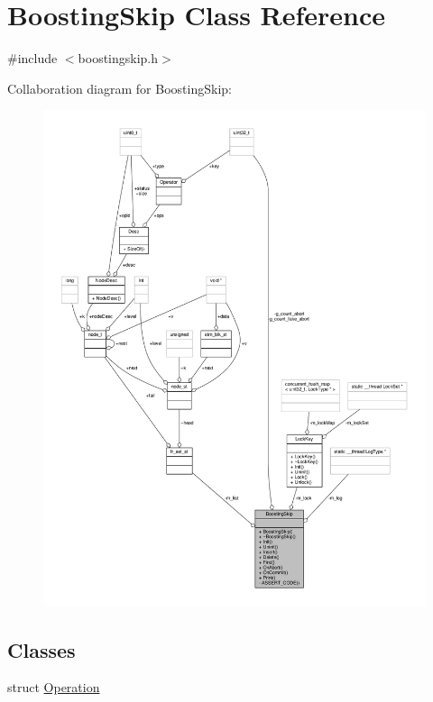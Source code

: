 \hypertarget{classBoostingSkip}{\section{Boosting\-Skip Class Reference}
\label{classBoostingSkip}
}


{\ttfamily \#include $<$boostingskip.\-h$>$}



Collaboration diagram for Boosting\-Skip\-:
\nopagebreak
\begin{figure}[H]
\begin{center}
\leavevmode
\includegraphics[width=350pt]{classBoostingSkip__coll__graph}
\end{center}
\end{figure}
\subsection*{Classes}
\begin{DoxyCompactItemize}
\item 
struct \hyperlink{structBoostingSkip_1_1Operation}{Operation}
\end{DoxyCompactItemize}

